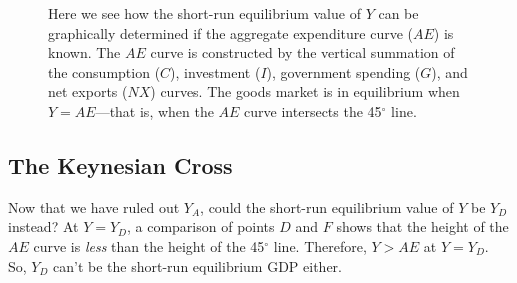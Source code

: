 \documentclass[
  letterpaper,
]{book}
\theoremstyle{plain}
\theoremstyle{remark}
\begin{document}
\begin{figure}


\caption{\label{fig-AE}Here we see how the short-run equilibrium value
of \(Y\) can be graphically determined if the aggregate expenditure
curve (\(AE\)) is known. The \(AE\) curve is constructed by the vertical
summation of the consumption (\(C\)), investment (\(I\)), government
spending (\(G\)), and net exports (\(NX\)) curves. The goods market is
in equilibrium when \(Y=AE\)---that is, when the \(AE\) curve intersects
the 45\(^{\circ}\) line.}

\end{figure}%

\subsection{The Keynesian Cross}\label{sec-keynes-cross}

Now that we have ruled out \(Y_A\), could the short-run equilibrium
value of \(Y\) be \(Y_D\) instead? At \(Y=Y_D\), a comparison of points
\(D\) and \(F\) shows that the height of the \(AE\) curve is \emph{less}
than the height of the 45\(^{\circ}\) line. Therefore, \(Y>AE\) at
\(Y=Y_D\). So, \(Y_D\) can't be the short-run equilibrium GDP either.
\end{document}
